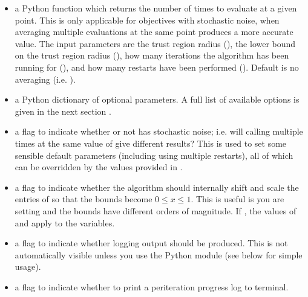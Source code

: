 \documentclass[letterpaper,10pt,english]{sphinxmanual}
\begin{document}
\begin{itemize}
\item {} 
 \sphinxhyphen{} a Python function  which returns the number of times to evaluate  at a given point. This is only applicable for objectives with stochastic noise, when averaging multiple evaluations at the same point produces a more accurate value. The input parameters are the trust region radius (), the lower bound on the trust region radius (), how many iterations the algorithm has been running for (), and how many restarts have been performed (). Default is no averaging (i.e. ).

\item {} 
 \sphinxhyphen{} a Python dictionary  of optional parameters. A full list of available options is given in the next section {\hyperref[\detokenize{advanced::doc}]{}}.

\item {} 
 \sphinxhyphen{} a flag to indicate whether or not  has stochastic noise; i.e. will calling  multiple times at the same value of  give different results? This is used to set some sensible default parameters (including using multiple restarts), all of which can be overridden by the values provided in .

\item {} 
 \sphinxhyphen{} a flag to indicate whether the algorithm should internally shift and scale the entries of  so that the bounds become \(0 \leq x \leq 1\). This is useful is you are setting  and the bounds have different orders of magnitude. If , the values of  and  apply to the  variables.

\item {} 
 \sphinxhyphen{} a flag to indicate whether logging output should be produced. This is not automatically visible unless you use the Python  module (see below for simple usage).

\item {} 
 \sphinxhyphen{} a flag to indicate whether to print a per\sphinxhyphen{}iteration progress log to terminal.

\end{itemize}
\end{document}
